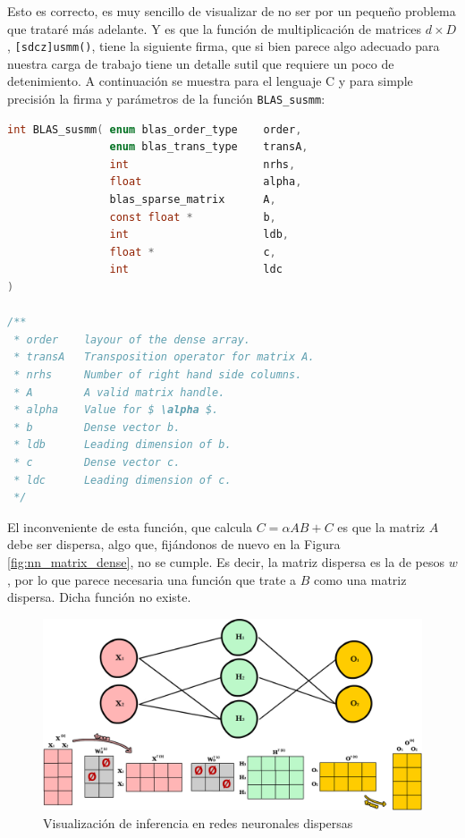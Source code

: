 Esto es correcto, es muy sencillo de visualizar de no ser por un pequeño problema que trataré más adelante. Y es que la función de multiplicación de matrices $d\times D$, \texttt{[sdcz]usmm()}, tiene la siguiente firma, que si bien parece algo adecuado para nuestra carga de trabajo tiene un detalle sutil que requiere un poco de detenimiento. A continuación se muestra para el lenguaje C y para simple precisión la firma y parámetros de la función \texttt{BLAS\_susmm}:

\begin{lstlisting}[language=C]
int BLAS_susmm( enum blas_order_type    order,
                enum blas_trans_type    transA,
                int                     nrhs,
                float                   alpha,
                blas_sparse_matrix      A,
                const float *           b,
                int                     ldb,
                float *                 c,
                int                     ldc 
)

/**
 * order    layour of the dense array.
 * transA   Transposition operator for matrix A.
 * nrhs     Number of right hand side columns.
 * A        A valid matrix handle.
 * alpha    Value for $ \alpha $.
 * b        Dense vector b.
 * ldb      Leading dimension of b.
 * c        Dense vector c.
 * ldc      Leading dimension of c.
 */
\end{lstlisting}

El inconveniente de esta función, que calcula $C = \alpha AB + C$ es que la matriz $A$ debe ser dispersa, algo que, fijándonos de nuevo en la Figura \ref{fig:nn_matrix_dense}, no se cumple. Es decir, la matriz dispersa es la de pesos $w$, por lo que parece necesaria una función que trate a $B$ como una matriz dispersa. Dicha función no existe.

\begin{figure}[h!]
    \centering
    \includegraphics[width=\textwidth]{img/neural_network_matrix_sparse/neural_network_matrix_sparse.png}
    \caption{Visualización de inferencia en redes neuronales dispersas}
    \label{fig:nn_matrix_sparse}
\end{figure}

